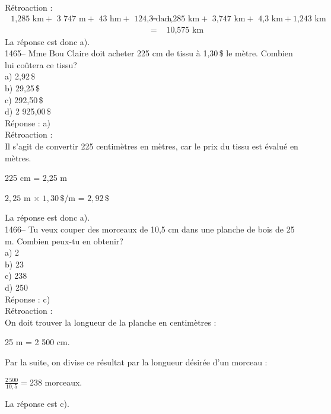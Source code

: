 R\'etroaction :
\begin{eqnarray*}
{\textrm{ 1,285 km}} + {\textrm{ 3 747 m}}+ {\textrm{ 43 hm}} +
{\textrm{ 124,3 dam}}&=&{\textrm{ 1,285 km}}+ {\textrm{ 3,747 km}} +
{\textrm{ 4,3 km}} + {\textrm{1,243 km}}\\[2mm]
&=&{\textrm{ 10,575 km}}
\end{eqnarray*}
La r\'eponse est donc a).\\[3mm]

1465-- Mme Bou Claire doit acheter 225 cm de tissu \`a 1,30\,\$ le
m\`etre. Combien lui co\^utera ce tissu?\\
a) 2,92\,\$\\
b) 29,25\,\$\\
c) 292,50\,\$\\
d) 2 925,00\,\$\\

R\'eponse : a)\\

R\'etroaction :\\
Il s'agit de convertir 225 centim\`etres en m\`etres, car le prix du
tissu est \'evalu\'e en m\`etres.
\begin{center}
225 cm = 2,25 m
\end{center}
\begin{center}
$2,25$ m $\times$ $1,30\,\$$/m = $2,92\,\$$
\end{center}
La r\'eponse est donc a).\\

1466-- Tu veux couper des morceaux de 10,5 cm dans une planche de
bois de 25 m. Combien peux-tu en obtenir?\\
a) 2\\
b) 23\\
c) 238\\
d) 250\\

R\'eponse : c)\\

R\'etroaction :\\
On doit trouver la longueur de la planche en centim\`etres :
\begin{center}
25 m = 2 500 cm.
\end{center}
Par la suite, on divise ce r\'esultat par la longueur d\'esir\'ee
d'un morceau :
\begin{center}
$\frac{2\,500}{10,5}={238}$ morceaux.
\end{center}
La r\'eponse est c).\\[3mm]

